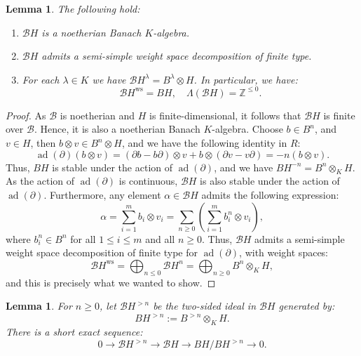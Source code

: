 \documentclass{amsart}
\newtheorem{Lemma}[defi]{Lemma}
\begin{document}
\begin{Lemma}
The following hold:
\begin{enumerate}[label=(\roman*)]
    \item $\mathscr{B}H$ is a noetherian Banach $K$-algebra.
    \item $\mathscr{B}H$ admits a semi-simple weight space decomposition of finite type.
    \item For each $\lambda \in K$ we have $\mathscr{B}H^{\lambda}=B^{\lambda}\otimes H$. In particular, we have:
    \begin{equation*}
        \mathscr{B}H^{\operatorname{ws}}=BH, \quad \Lambda(\mathscr{B}H)=\mathbb{Z}^{\leq 0}.
    \end{equation*}
\end{enumerate}
\end{Lemma}
\begin{proof}
 As $\mathscr{B}$ is noetherian and $H$ is finite-dimensional, it follows that $\mathscr{B}H$ is finite over $\mathscr{B}$. Hence, it is also a noetherian Banach $K$-algebra. Choose $b\in B^n$, and $v\in H$, then $b\otimes v\in B^n\otimes H$, and we have the following identity in $R$:
 \begin{equation*}
     \operatorname{ad}(\partial)(b\otimes v)=(\partial b-b\partial)\otimes v +b\otimes (\partial v-v\partial)=-n(b\otimes v).
 \end{equation*}
Thus, $BH$ is stable under the action of $\operatorname{ad}(\partial)$, and we have $BH^{-n}=B^n\otimes_K H$. As the action of $\operatorname{ad}(\partial)$ is continuous, $\mathscr{B}H$ is also stable under the action of $\operatorname{ad}(\partial)$. Furthermore, any element $\alpha\in \mathscr{B}H$ admits the following expression:
\begin{equation*}
    \alpha= \sum_{i=1}^mb_i\otimes v_i=\sum_{n\geq 0}\left(\sum_{i=1}^mb_i^n\otimes v_i\right),
\end{equation*}
where $b_i^n\in B^n$ for all $1\leq i \leq m$ and all $n\geq 0$. Thus, 
$\mathscr{B}H$ admits a semi-simple weight space decomposition of finite type for $\operatorname{ad}(\partial)$, with weight spaces:
\begin{equation*}
    \mathscr{B}H^{\operatorname{ws}}=\bigoplus_{n\leq 0}\mathscr{B}H^n=\bigoplus_{n\geq 0}B^n\otimes_KH,
\end{equation*}
and this is precisely what we wanted to show.
\end{proof}
\begin{Lemma}\label{Lemma short exact sequence quotients}
For $n\geq 0$, let $\mathscr{B}H^{>n}$ be the two-sided ideal in $\mathscr{B}H$ generated by:
\begin{equation*}
    BH^{>n}:=B^{>n}\otimes_KH.
\end{equation*}
There is a short exact sequence:
\begin{equation*}
  0\rightarrow \mathscr{B}H^{>n}\rightarrow \mathscr{B}H \rightarrow BH/BH^{>n}\rightarrow 0.  
\end{equation*}
\end{Lemma}
\end{document}
